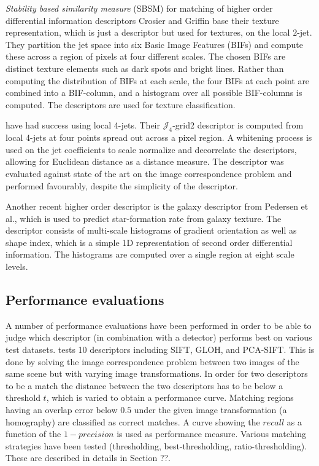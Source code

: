 \documentclass[../thesis.tex]{subfiles}
\begin{document}
\emph{Stability based similarity measure} (SBSM) \cite{balmashnova2008novel} for matching of higher order differential information descriptors Crosier and Griffin \cite{crosier2010using} base their texture representation, which is just a descriptor but used for textures, on the local $2$-jet. They partition the jet space into six Basic Image Features (BIFs) and compute these across a region of pixels at four different scales. The chosen BIFs are distinct texture elements such as dark spots and bright lines. Rather than computing the distribution of BIFs at each scale, the four BIFs at each point are combined into a BIF-column, and a histogram over all possible BIF-columns is computed. The descriptors are used for texture classification.

\cite{larsen2012jet} have had success using local 4-jets. Their $\mathcal{J}_4$-grid2 descriptor is computed from local 4-jets at four points spread out across a pixel region. A whitening process is used on the jet coefficients to scale normalize and decorrelate the descriptors, allowing for Euclidean distance as a distance measure. The descriptor was evaluated against state of the art on the image correspondence problem and performed favourably, despite the simplicity of the descriptor.

Another recent higher order descriptor is the galaxy descriptor from Pedersen et al.\cite{pedersen2013shape}, which is used to predict star-formation rate from galaxy texture. The descriptor consists of multi-scale histograms of gradient orientation as well as shape index, which is a simple 1D representation of second order differential information. The histograms are computed over a single region at eight scale levels.

\subsection{Performance evaluations}
A number of performance evaluations have been performed in order to be able to judge which descriptor (in combination with a detector) performs best on various test datasets. \cite{mikolajczyk2005performance} tests 10 descriptors including SIFT, GLOH, and PCA-SIFT. This is done by solving the image correspondence problem between two images of the same scene but with varying image transformations. In order for two descriptors to be a match the distance between the two descriptors has to be below a threshold $t$, which is varied to obtain a performance curve. Matching regions having an overlap error below $0.5$ under the given image transformation (a homography) are classified as correct matches. A curve showing the $recall$ as a function of the $1-precision$ is used as performance measure. Various matching strategies have been tested (thresholding, best-thresholding, ratio-thresholding). These are described in details in Section ??.
\end{document}
